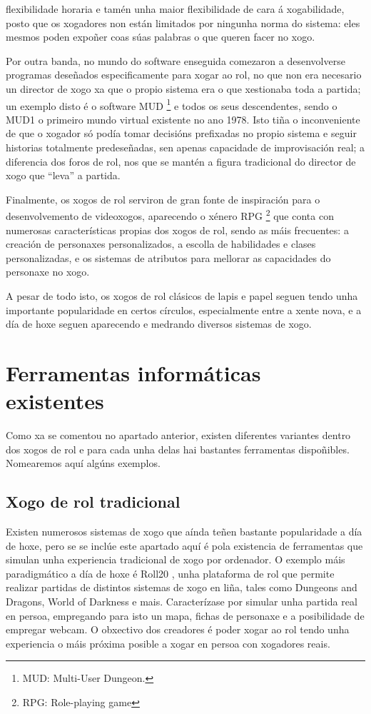 flexibilidade horaria e tamén unha maior flexibilidade de cara á xogabilidade,
posto que os xogadores non están limitados por ningunha norma do sistema: eles
mesmos poden expoñer coas súas palabras o que queren facer no xogo.
\par
Por outra banda, no mundo do software enseguida comezaron a desenvolverse
programas deseñados especificamente para xogar ao rol, no que non era necesario
un director de xogo xa que o propio sistema era o que xestionaba toda a partida;
un exemplo disto é o software MUD \footnote{MUD: Multi-User Dungeon.} e todos os
seus descendentes, sendo o MUD1 o primeiro mundo virtual
existente no ano 1978\cite{mud}.
Isto tiña o inconveniente de que o xogador só podía tomar decisións prefixadas no
propio sistema e seguir historias totalmente predeseñadas, sen apenas capacidade
de improvisación real; a diferencia dos foros de rol, nos que se mantén a
figura tradicional do director de xogo que ``leva'' a partida.
\par
Finalmente, os xogos de rol serviron de gran fonte de inspiración para o
desenvolvemento de videoxogos, aparecendo o xénero RPG
\footnote{RPG: Role-playing game} que conta con numerosas características
propias dos xogos de rol, sendo as máis frecuentes: a creación de personaxes
personalizados, a escolla de habilidades e clases personalizadas, e os sistemas
de atributos para mellorar as capacidades do personaxe no xogo.
\par
A pesar de todo isto, os xogos de rol clásicos de lapis e papel seguen tendo
unha importante popularidade en certos círculos, especialmente entre a xente
nova, e a día de hoxe seguen aparecendo e medrando diversos sistemas de xogo.

\section{Ferramentas informáticas existentes}
Como xa se comentou no apartado anterior, existen diferentes variantes dentro
dos xogos de rol e para cada unha delas hai bastantes ferramentas dispoñibles.
Nomearemos aquí algúns exemplos.
\subsection{Xogo de rol tradicional}
Existen numerosos sistemas de xogo que aínda teñen bastante popularidade a día
de hoxe, pero se se inclúe este apartado aquí é pola existencia de ferramentas
que simulan unha experiencia tradicional de xogo por ordenador. O exemplo máis
paradigmático a día de hoxe é Roll20 \cite{roll20}, unha plataforma de rol que
permite realizar partidas de distintos sistemas de xogo en liña, tales como
Dungeons and Dragons, World of Darkness e mais. Caracterízase por simular unha
partida real en persoa, empregando para isto un mapa, fichas de personaxe e a
posibilidade de empregar webcam. O obxectivo dos creadores é poder xogar ao rol
tendo unha experiencia o máis próxima posible a xogar en persoa con xogadores
reais.

